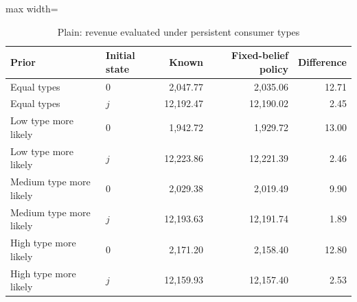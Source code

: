 \begin{table}[htbp]\centering\small
\caption{Plain: revenue evaluated under persistent consumer types}
\label{tab:empirical-information-plain}
\begin{adjustbox}{max width=\linewidth}
\begin{tabular}{llrrr}\toprule
Prior & Initial state & Known & Fixed-belief policy & Difference\\\midrule
Equal types & $0$ & 2,047.77 & 2,035.06 & 12.71 \\
Equal types & $j$ & 12,192.47 & 12,190.02 & 2.45 \\
Low type more likely & $0$ & 1,942.72 & 1,929.72 & 13.00 \\
Low type more likely & $j$ & 12,223.86 & 12,221.39 & 2.46 \\
Medium type more likely & $0$ & 2,029.38 & 2,019.49 & 9.90 \\
Medium type more likely & $j$ & 12,193.63 & 12,191.74 & 1.89 \\
High type more likely & $0$ & 2,171.20 & 2,158.40 & 12.80 \\
High type more likely & $j$ & 12,159.93 & 12,157.40 & 2.53 \\
\bottomrule\end{tabular}
\end{adjustbox}
\end{table}
